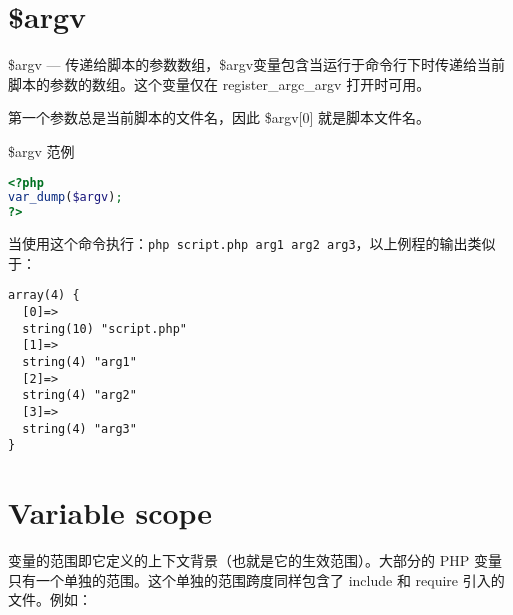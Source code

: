 \begin{example}

\begin{lstlisting}[language=PHP]

\end{lstlisting}
\end{example}

\begin{example}

\begin{lstlisting}[language=PHP]

\end{lstlisting}
\end{example}

\begin{example}

\begin{lstlisting}[language=PHP]

\end{lstlisting}
\end{example}



\section{\$argv}

\$argv — 传递给脚本的参数数组，\$argv变量包含当运行于命令行下时传递给当前脚本的参数的数组。这个变量仅在 register\_argc\_argv 打开时可用。

第一个参数总是当前脚本的文件名，因此 \$argv[0] 就是脚本文件名。


\begin{example}
\$argv 范例
\begin{lstlisting}[language=PHP]
<?php
var_dump($argv);
?>
\end{lstlisting}
\end{example}

当使用这个命令执行：\verb|php script.php arg1 arg2 arg3|，以上例程的输出类似于：

\begin{verbatim}
array(4) {
  [0]=>
  string(10) "script.php"
  [1]=>
  string(4) "arg1"
  [2]=>
  string(4) "arg2"
  [3]=>
  string(4) "arg3"
}
\end{verbatim}

\section{Variable scope}


变量的范围即它定义的上下文背景（也就是它的生效范围）。大部分的 PHP 变量只有一个单独的范围。这个单独的范围跨度同样包含了 include 和 require 引入的文件。例如：


